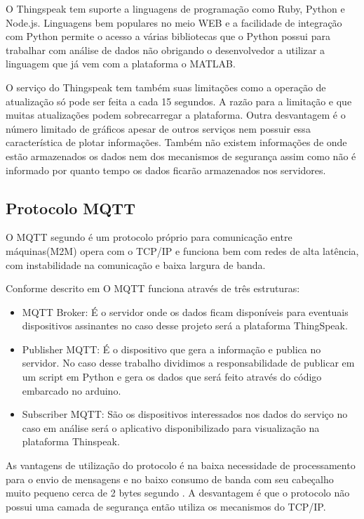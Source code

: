 O Thingspeak tem suporte a linguagens de programação como Ruby, Python e Node.js. Linguagens bem populares no meio WEB e a facilidade de integração com Python permite o acesso a várias bibliotecas que o Python possui para trabalhar com análise de dados não obrigando o desenvolvedor a utilizar a linguagem que já vem com a plataforma o MATLAB.

O serviço do Thingspeak tem também suas limitações como a operação de atualização só pode ser feita a cada 15 segundos. A razão para a limitação e que muitas atualizações podem sobrecarregar a plataforma. Outra desvantagem é o número limitado de gráficos apesar de outros serviços nem possuir essa característica de plotar informações. Também não existem informações de onde estão armazenados os dados nem dos mecanismos de segurança assim como não é informado por quanto tempo os dados ficarão armazenados nos servidores.

\subsection{Protocolo MQTT}

O MQTT segundo \cite{torres2016analise} é um protocolo próprio para comunicação entre máquinas(M2M) opera com o TCP/IP e funciona bem com redes de alta latência, com instabilidade na comunicação e baixa largura de banda.

Conforme descrito em \cite{de2017internet} O MQTT funciona através de três estruturas:

\begin{itemize}
\item MQTT Broker: É o servidor onde os dados ficam disponíveis para eventuais dispositivos assinantes no caso desse projeto será a plataforma ThingSpeak.
\item Publisher MQTT: É o dispositivo que gera a informação e publica no servidor. No caso desse trabalho dividimos a responsabilidade de publicar em um script em Python e gera os dados que será feito através do código embarcado no arduino.
\item Subscriber MQTT: São os dispositivos interessados nos dados do serviço no caso em análise será o aplicativo disponibilizado para visualização na plataforma Thinspeak.
\end{itemize}

As vantagens de utilização do protocolo é na baixa necessidade de processamento para o envio de mensagens e no baixo consumo de banda com seu cabeçalho muito pequeno cerca de 2 bytes segundo \cite{mota2017analise}. A desvantagem é que o protocolo não possui uma camada de segurança então utiliza os mecanismos do TCP/IP.


